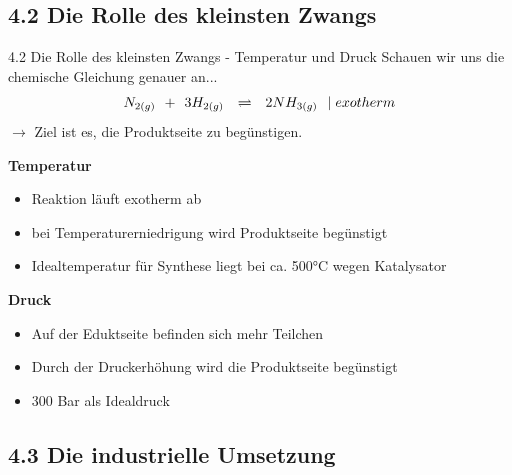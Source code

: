 \documentclass[
    aspectratio=1610
    ]{beamer}
\begin{document}
    \subsection{\textbf{4.2} Die Rolle des kleinsten Zwangs}

    \begin{frame}{4.2 Die Rolle des kleinsten Zwangs - Temperatur und Druck}
        Schauen wir uns die chemische Gleichung genauer an...
        $$N_{2(g)}\hspace{.15cm} +\hspace{.15cm} 3H_{2(g)}\hspace{.25cm} \rightleftharpoons\hspace{.25cm} 2NH_{3(g)}\hspace{.25cm}|\hspace{.1cm}exotherm$$
        $\rightarrow$ Ziel ist es, die Produktseite zu begünstigen.\newline
        \begin{minipage}{6.75cm}
            \vspace{.5cm}
            \textbf{Temperatur}
            \begin{itemize}
                \item Reaktion läuft exotherm ab
                \item bei Temperaturerniedrigung wird Produktseite begünstigt
                \item Idealtemperatur für Synthese liegt bei ca. 500°C wegen Katalysator
            \end{itemize}
        \end{minipage}
        \begin{minipage}{6.75cm}
            \vspace{.5cm}
            \textbf{Druck}
            \begin{itemize}
                \item Auf der Eduktseite befinden sich mehr Teilchen
                \item Durch der Druckerhöhung wird die Produktseite begünstigt
                \item 300 Bar als Idealdruck
            \end{itemize}
        \end{minipage}
    \end{frame}
    
    \subsection{\textbf{4.3} Die industrielle Umsetzung}
\end{document}
